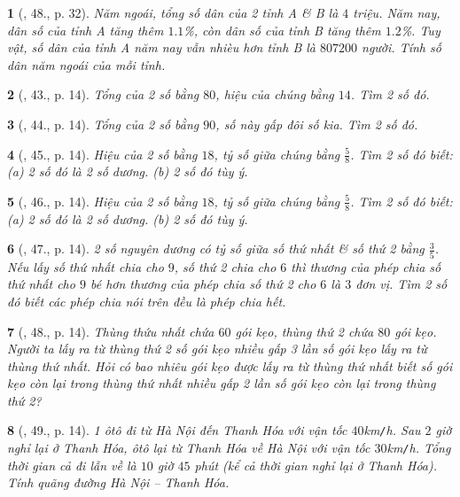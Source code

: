 \documentclass{article}
\newtheorem{baitoan}{}
\begin{document}
\begin{baitoan}[\cite{SGK_Toan_8_tap_2}, 48., p. 32]
	Năm ngoái, tổng số dân của 2 tỉnh A \& B là $4$ triệu. Năm nay, dân số của tỉnh A tăng thêm $1.1$\%, còn dân số của tỉnh B tăng thêm $1.2$\%. Tuy vật, số dân của tỉnh A năm nay vẫn nhièu hơn tỉnh B là $807200$ người. Tính số dân năm ngoái của mỗi tỉnh.
\end{baitoan}

\begin{baitoan}[\cite{SBT_Toan_8_tap_2}, 43., p. 14]
	Tổng của 2 số bằng $80$, hiệu của chúng bằng $14$. Tìm 2 số đó.	
\end{baitoan}

\begin{baitoan}[\cite{SBT_Toan_8_tap_2}, 44., p. 14]
	Tổng của 2 số bằng $90$, số này gấp đôi số kia. Tìm 2 số đó.
\end{baitoan}

\begin{baitoan}[\cite{SBT_Toan_8_tap_2}, 45., p. 14]
	Hiệu của 2 số bằng $18$, tỷ số giữa chúng bằng $\frac{5}{8}$. Tìm 2 số đó biết: (a) 2 số đó là 2 số dương. (b) 2 số đó tùy ý.
\end{baitoan}

\begin{baitoan}[\cite{SBT_Toan_8_tap_2}, 46., p. 14]
	Hiệu của 2 số bằng $18$, tỷ số giữa chúng bằng $\frac{5}{8}$. Tìm 2 số đó biết: (a) 2 số đó là 2 số dương. (b) 2 số đó tùy ý.
\end{baitoan}

\begin{baitoan}[\cite{SBT_Toan_8_tap_2}, 47., p. 14]
	2 số nguyên dương có tỷ số giữa số thứ nhất \& số thứ 2 bằng $\frac{3}{5}$. Nếu lấy số thứ nhất chia cho $9$, số thứ 2 chia cho $6$ thì thương của phép chia số thứ nhất cho $9$ bé hơn thương của phép chia số thứ 2 cho $6$ là $3$ đơn vị. Tìm 2 số đó biết các phép chia nói trên đều là phép chia hết.
\end{baitoan}

\begin{baitoan}[\cite{SBT_Toan_8_tap_2}, 48., p. 14]
	Thùng thứu nhất chứa $60$ gói kẹo, thùng thứ 2 chứa $80$ gói kẹo. Người ta lấy ra từ thùng thứ 2 số gói kẹo nhiều gấp 3 lần số gói kẹo lấy ra từ thùng thứ nhất. Hỏi có bao nhiêu gói kẹo được lấy ra từ thùng thứ nhất biết số gói kẹo còn lại trong thùng thứ nhất nhiều gấp 2 lần số gói kẹo còn lại trong thùng thứ 2?
\end{baitoan}

\begin{baitoan}[\cite{SBT_Toan_8_tap_2}, 49., p. 14]
	1 ôtô đi từ Hà Nội đến Thanh Hóa với vận tốc $40$\emph{km\texttt{/}h}. Sau $2$ giờ nghỉ lại ở Thanh Hóa, ôtô lại từ Thanh Hóa về Hà Nội với vận tốc $30$\emph{km\texttt{/}h}. Tổng thời gian cả đi lẫn về là $10$ giờ $45$ phút (kể cả thời gian nghỉ lại ở Thanh Hóa). Tính quãng đường Hà Nội -- Thanh Hóa.
\end{baitoan}
\end{document}
